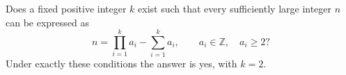 Does a fixed positive integer $k$ exist such that every sufficiently large integer $n$ can be expressed as
\[n=\prod_{i=1}^k a_i-\sum_{i=1}^k a_i,\qquad a_i\in\mathbb Z,\quad a_i\ge2?\]
Under exactly these conditions the answer is yes, with $k=2$.
